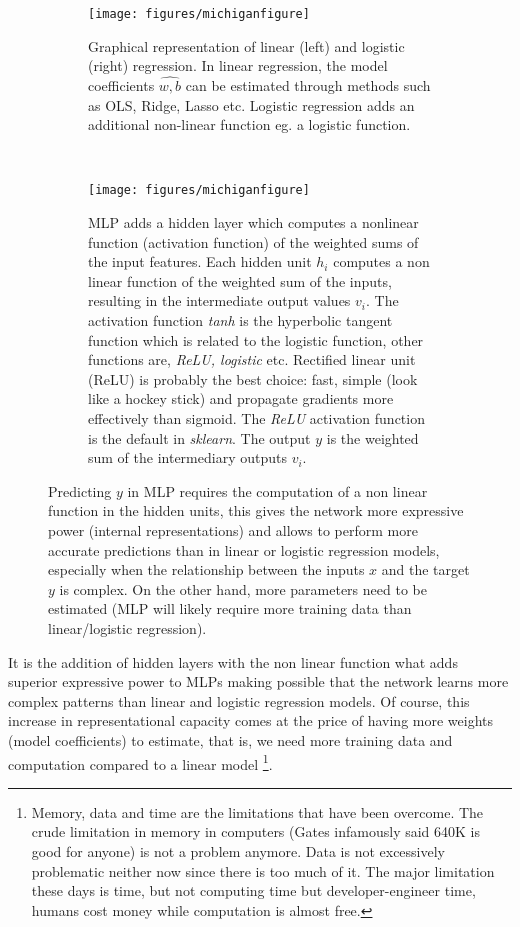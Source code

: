 \documentclass[11pt]{article}
\theoremstyle{definition}
\theoremstyle{remark}
\begin{document}
\begin{figure}[H]
    \centering
    \begin{subfigure}[t]{.8\textwidth}
        \centering
        \texttt{[image: figures/michiganfigure]}
        \caption{Graphical representation of linear (left) and logistic (right) regression. In linear regression, the model coefficients $\hat{w,b}$ can be estimated through methods such as OLS, Ridge, Lasso etc. Logistic regression adds an additional non-linear function eg. a logistic function.}
    \end{subfigure}
    ~ 
    \begin{subfigure}[t]{.8\textwidth}
        \centering
        \texttt{[image: figures/michiganfigure]}
        \caption{MLP adds a hidden layer which computes a nonlinear function (activation function) of the weighted sums of the input features. Each hidden unit $h_i$ computes a non linear function of the weighted sum of the inputs, resulting in the intermediate output values $v_i$. The activation function \textit{tanh} is the hyperbolic tangent function which is related to the logistic function, other functions are, \textit{ReLU, logistic} etc. Rectified linear unit (ReLU) is probably the best choice: fast, simple (look like a hockey stick) and propagate gradients more effectively than sigmoid. The \textit{ReLU} activation function is the default in \emph{sklearn}. The output $y$ is the weighted sum of the intermediary outputs $v_i$.}
    \end{subfigure}%
    \caption{Predicting $y$ in MLP requires the computation of a non linear function in the hidden units, this gives the network more expressive power (internal representations) and allows to perform more accurate predictions than in linear or logistic regression models, especially when the relationship between the inputs $x$ and the target $y$ is complex. On the other hand, more parameters need to be estimated (MLP will likely require more training data than linear/logistic regression).} \label{fig:mich}
\end{figure}

It is the addition of hidden layers with the non linear function what adds superior expressive power to MLPs making possible that the network learns more complex patterns than linear and logistic regression models. Of course, this increase in representational capacity comes at the price of having more weights (model coefficients) to estimate, that is, we need more training data and computation compared to a linear model \footnote{Memory, data and time are the limitations that have been overcome. The crude limitation in memory in computers (Gates infamously said  640K is good for anyone) is not a problem anymore. Data is not excessively problematic neither now since there is too much of it. The major limitation these days is time, but not computing time but developer-engineer time, humans cost money while computation is almost free.}.
\end{document}
